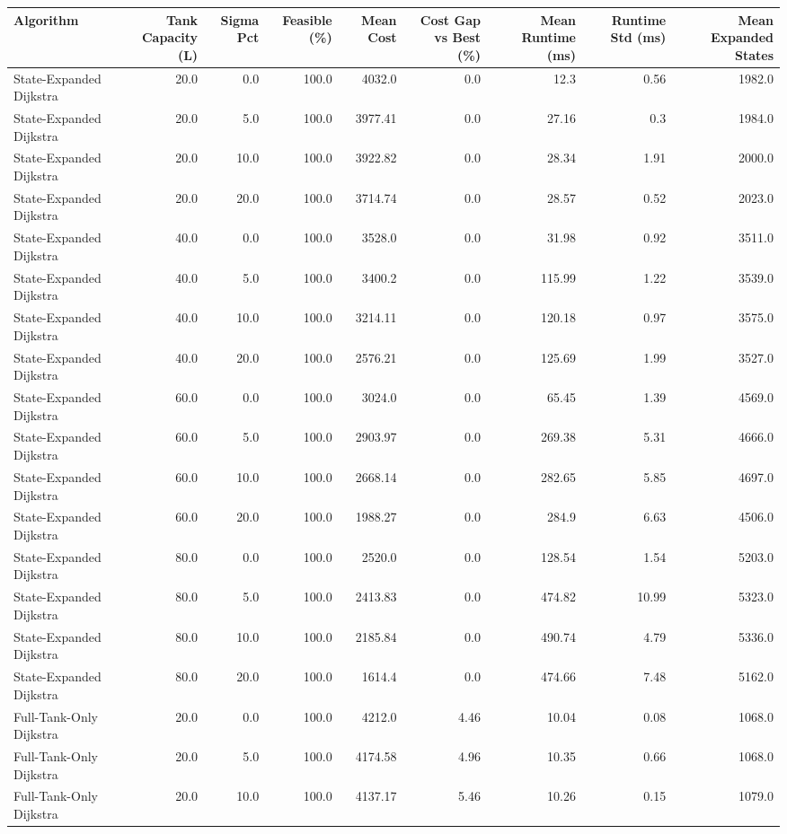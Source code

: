 \begin{tabular}{lrrrrrrrr}
\hline
Algorithm & Tank Capacity (L) & Sigma Pct & Feasible (\%) & Mean Cost & Cost Gap vs Best (\%) & Mean Runtime (ms) & Runtime Std (ms) & Mean Expanded States \\
\hline
State-Expanded Dijkstra & 20.0 & 0.0 & 100.0 & 4032.0 & 0.0 & 12.3 & 0.56 & 1982.0 \\
State-Expanded Dijkstra & 20.0 & 5.0 & 100.0 & 3977.41 & 0.0 & 27.16 & 0.3 & 1984.0 \\
State-Expanded Dijkstra & 20.0 & 10.0 & 100.0 & 3922.82 & 0.0 & 28.34 & 1.91 & 2000.0 \\
State-Expanded Dijkstra & 20.0 & 20.0 & 100.0 & 3714.74 & 0.0 & 28.57 & 0.52 & 2023.0 \\
State-Expanded Dijkstra & 40.0 & 0.0 & 100.0 & 3528.0 & 0.0 & 31.98 & 0.92 & 3511.0 \\
State-Expanded Dijkstra & 40.0 & 5.0 & 100.0 & 3400.2 & 0.0 & 115.99 & 1.22 & 3539.0 \\
State-Expanded Dijkstra & 40.0 & 10.0 & 100.0 & 3214.11 & 0.0 & 120.18 & 0.97 & 3575.0 \\
State-Expanded Dijkstra & 40.0 & 20.0 & 100.0 & 2576.21 & 0.0 & 125.69 & 1.99 & 3527.0 \\
State-Expanded Dijkstra & 60.0 & 0.0 & 100.0 & 3024.0 & 0.0 & 65.45 & 1.39 & 4569.0 \\
State-Expanded Dijkstra & 60.0 & 5.0 & 100.0 & 2903.97 & 0.0 & 269.38 & 5.31 & 4666.0 \\
State-Expanded Dijkstra & 60.0 & 10.0 & 100.0 & 2668.14 & 0.0 & 282.65 & 5.85 & 4697.0 \\
State-Expanded Dijkstra & 60.0 & 20.0 & 100.0 & 1988.27 & 0.0 & 284.9 & 6.63 & 4506.0 \\
State-Expanded Dijkstra & 80.0 & 0.0 & 100.0 & 2520.0 & 0.0 & 128.54 & 1.54 & 5203.0 \\
State-Expanded Dijkstra & 80.0 & 5.0 & 100.0 & 2413.83 & 0.0 & 474.82 & 10.99 & 5323.0 \\
State-Expanded Dijkstra & 80.0 & 10.0 & 100.0 & 2185.84 & 0.0 & 490.74 & 4.79 & 5336.0 \\
State-Expanded Dijkstra & 80.0 & 20.0 & 100.0 & 1614.4 & 0.0 & 474.66 & 7.48 & 5162.0 \\
Full-Tank-Only Dijkstra & 20.0 & 0.0 & 100.0 & 4212.0 & 4.46 & 10.04 & 0.08 & 1068.0 \\
Full-Tank-Only Dijkstra & 20.0 & 5.0 & 100.0 & 4174.58 & 4.96 & 10.35 & 0.66 & 1068.0 \\
Full-Tank-Only Dijkstra & 20.0 & 10.0 & 100.0 & 4137.17 & 5.46 & 10.26 & 0.15 & 1079.0 \\

\end{tabular}
